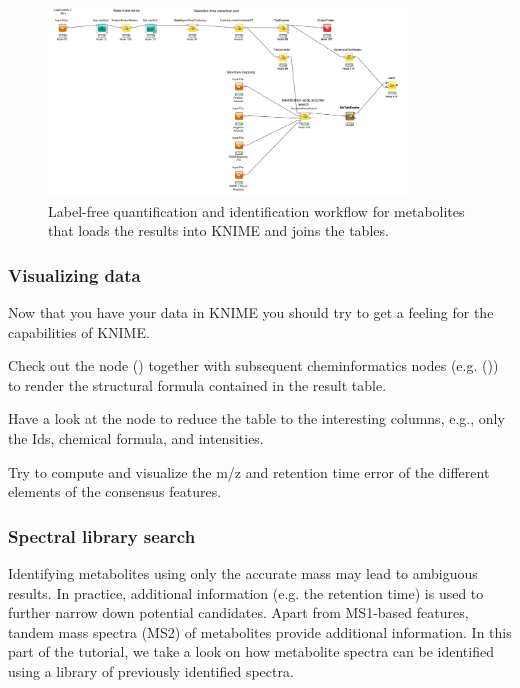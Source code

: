 \begin{figure}[htbp]
  \centering
  \includegraphics[width=0.85\textwidth]{graphics/metabo/metabo_part3_2015}
  \caption{Label-free quantification and identification workflow for metabolites that loads the results into KNIME and joins the tables.}
  \label{fig:metabo_part3}
\end{figure}

\subsubsection{Visualizing data}

Now that you have your data in KNIME you should try to get a feeling for the capabilities of KNIME.

\begin{task}
Check out the   node () together with subsequent cheminformatics nodes (e.g.  ()) to render the structural formula contained in the result table.

\end{task}
\begin{task}
Have a look at the  node to reduce the table to the interesting columns, e.g., only the Ids, chemical formula, and intensities.
\end{task}
\begin{task}
Try to compute and visualize the m/z and retention time error of the different elements of the consensus features.
\end{task}

\subsubsection{Spectral library search}

Identifying metabolites using only the accurate mass may lead to ambiguous results. In practice, additional information (e.g. the retention time) is used to further narrow down potential candidates. Apart from MS1-based features, tandem mass spectra (MS2) of metabolites provide additional information.
In this part of the tutorial, we take a look on how metabolite spectra can be identified using a library of previously identified spectra.


